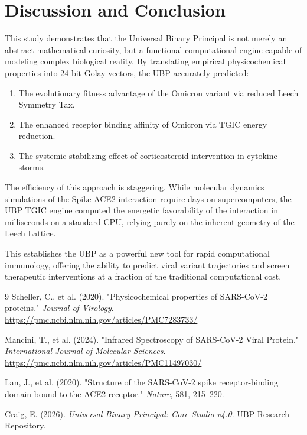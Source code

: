 \documentclass[11pt,a4paper]{article}
\begin{document}
\section{Discussion and Conclusion}

This study demonstrates that the Universal Binary Principal is not merely an abstract mathematical curiosity, but a functional computational engine capable of modeling complex biological reality. By translating empirical physicochemical properties into 24-bit Golay vectors, the UBP accurately predicted:

\begin{enumerate}
    \item The evolutionary fitness advantage of the Omicron variant via reduced Leech Symmetry Tax.
    \item The enhanced receptor binding affinity of Omicron via TGIC energy reduction.
    \item The systemic stabilizing effect of corticosteroid intervention in cytokine storms.
\end{enumerate}

The efficiency of this approach is staggering. While molecular dynamics simulations of the Spike-ACE2 interaction require days on supercomputers, the UBP TGIC engine computed the energetic favorability of the interaction in milliseconds on a standard CPU, relying purely on the inherent geometry of the Leech Lattice.

This establishes the UBP as a powerful new tool for rapid computational immunology, offering the ability to predict viral variant trajectories and screen therapeutic interventions at a fraction of the traditional computational cost.

\vspace{2em}

\begin{thebibliography}{9}
Scheller, C., et al. (2020). "Physicochemical properties of SARS-CoV-2 proteins." \textit{Journal of Virology}. \url{https://pmc.ncbi.nlm.nih.gov/articles/PMC7283733/}

Mancini, T., et al. (2024). "Infrared Spectroscopy of SARS-CoV-2 Viral Protein." \textit{International Journal of Molecular Sciences}. \url{https://pmc.ncbi.nlm.nih.gov/articles/PMC11497030/}

Lan, J., et al. (2020). "Structure of the SARS-CoV-2 spike receptor-binding domain bound to the ACE2 receptor." \textit{Nature}, 581, 215–220.

Craig, E. (2026). \textit{Universal Binary Principal: Core Studio v4.0}. UBP Research Repository.
\end{thebibliography}
\end{document}
